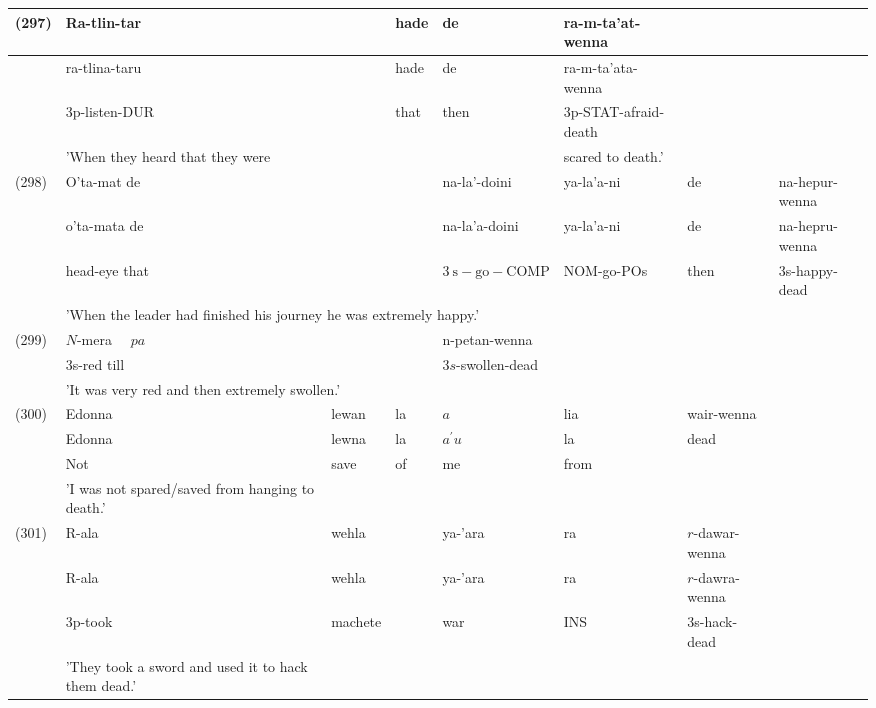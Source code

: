 \documentclass[10pt]{article}
\begin{document}
\begin{center}
\begin{tabular}{|l|l|l|l|l|l|l|l|}
\hline
\multirow[t]{4}{*}{(297)} & Ra-tlin-tar &  & hade & de & ra-m-ta'at-wenna &  &  \\
\hline
 & ra-tlina-taru &  & hade & de & ra-m-ta'ata-wenna &  &  \\
\hline
 & 3p-listen-DUR &  & that & then & 3p-STAT-afraid-death &  &  \\
\hline
 & 'When they heard that they were &  &  &  & scared to death.' &  &  \\
\hline
\multirow[t]{4}{*}{(298)} & O'ta-mat de &  &  & na-la'-doini & ya-la'a-ni & de & na-hepur-wenna \\
\hline
 & o'ta-mata de &  &  & na-la'a-doini & ya-la'a-ni & de & na-hepru-wenna \\
\hline
 & head-eye that &  &  & \(3 \mathrm{~s}-\mathrm{go}-\mathrm{COMP}\) & NOM-go-POs & then & 3s-happy-dead \\
\hline
 & \multicolumn{7}{|l|}{'When the leader had finished his journey he was extremely happy.'} \\
\hline
\multirow[t]{3}{*}{(299)} & \(N\)-mera \(\quad p a\) &  &  & n-petan-wenna &  &  &  \\
\hline
 & 3s-red till &  &  & \(3 s\)-swollen-dead &  &  &  \\
\hline
 & \multicolumn{7}{|l|}{'It was very red and then extremely swollen.'} \\
\hline
\multirow[t]{4}{*}{(300)} & Edonna & lewan & la & \(a\) & lia & wair-wenna &  \\
\hline
 & Edonna & lewna & la & \(a^{\prime} u\) & la & \multirow{3}{*}{dead} & \multirow{3}{*}{} \\
\hline
 & Not & save & of & me & from &  &  \\
\hline
 & 'I was not spared/saved from hanging to death.' &  &  &  &  &  &  \\
\hline
\multirow[t]{4}{*}{(301)} & R-ala & wehla &  & ya-'ara & ra & \(r\)-dawar-wenna &  \\
\hline
 & R-ala & wehla &  & ya-'ara & ra & \(r\)-dawra-wenna &  \\
\hline
 & 3p-took & machete &  & war & INS & 3s-hack-dead &  \\
\hline
 & 'They took a sword and used it to hack them dead.' &  &  &  &  &  &  \\
\hline
\end{tabular}
\end{center}
\end{document}
